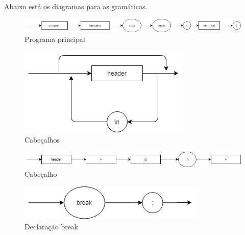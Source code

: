 \documentclass[]{article}
\numberwithin{equation}{section}
\begin{document}
Abaixo está os diagramas para as gramáticas.

\begin{center}
\begin{figure}[h!]
  \includegraphics[width=\linewidth]{./assets/program.png}
  \caption{Programa principal}
\end{figure}
\end{center}

\begin{center}
\begin{figure}[h!]
  \includegraphics[width=\linewidth]{./assets/headers.png}
  \caption{Cabeçalhos}
\end{figure}
\end{center}

\begin{center}
\begin{figure}[h!]
  \includegraphics[width=\linewidth]{./assets/header.png}
  \caption{Cabeçalho}
\end{figure}
\end{center}

\begin{center}
\begin{figure}[h!]
  \includegraphics[width=\linewidth]{./assets/break_stmt.png}
  \caption{Declaração break}
\end{figure}
\end{center}
\end{document}
